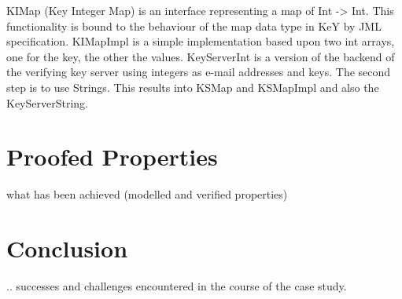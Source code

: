 \documentclass{llncs}
\begin{document}
KIMap (Key Integer Map) is an interface representing a map of Int -> Int. This
functionality is bound to the behaviour of the map data type in KeY by JML
specification. KIMapImpl is a simple implementation based upon two int arrays,
one for the key, the other the values. KeyServerInt is a version of the backend
of the verifying key server using integers as e-mail addresses and keys. The
second step is to use Strings. This results into KSMap and KSMapImpl and also
the KeyServerString.

\section{Proofed Properties}

what has been achieved (modelled and verified properties)


\section{Conclusion }

.. successes and challenges encountered in the course of the case study.
\end{document}
